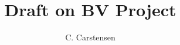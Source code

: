 \setcounter{stepc}{0}
\newcommand{\step}[1]{\refstepcounter{stepc}{\smallskip

\noindent \textit{Step \thestepc \ (#1):}}}



\newcommand{\R}{\mathbb{R}}
\newcommand{\dx}{\,dx}
\newcommand{\ds}{\,ds}

\newcommand{\ddiv}{\operatorname{div}}
\def\mint{-\kern-1.00em\int}
\newcommand{\tri}{\mathcal T}
\newcommand{\E}{\mathcal E}


\newcommand{\ucr}{u_{\operatorname{CR}}}
\newcommand{\ucrvarepsilon}{u_{\operatorname{CR},\varepsilon}}
\newcommand{\vcr}{v_{\operatorname{CR}}}
\newcommand{\wcr}{w_{\operatorname{CR}}}
\newcommand{\nc}{{\textup{\tiny NC}}}
\newcommand{\ucreps}{u_{\varepsilon,\operatorname{CR}}}

\newcommand{\Cont}{C}
\newcommand{\RT}{\operatorname{RT}_0}
\newcommand{\rt}{{\operatorname{RT}}}
\newcommand{\prt}{p_{\operatorname{RT}}}
\newcommand{\qrt}{q_{\operatorname{RT}}}
\newcommand{\rrt}{r_{\operatorname{RT}}}
\newcommand{\CR}{{\operatorname{CR}}^1_0}
\newcommand{\Cr}{{\operatorname{CR}}}

\newcommand{\midp}{{\operatorname{mid}}}
\newcommand{\F}{\mathcal{F}}

\newcommand{\N}{\mathcal{N}}
\newcommand{\grad}{\nabla}
\newcommand{\gradnc}{\nabla_\nc}
\newcommand{\divnc}{\operatorname{div}_\nc}
\newcommand{\T}{\mathcal{T}}

\newcommand{\BV}{\operatorname{BV}}
\newcommand{\osc}{\operatorname{osc}}
\newcommand\normg[2]{\left\| #1 \right\|_{L^2( #2 )}}
\newcommand{\EL}{{\operatorname{EL}}}

\newcommand{\conf}{\textup{\tiny C}}

\DeclareMathOperator{\sign}{sign}

\title{Draft on BV Project}
\author{C. Carstensen}
\maketitle
